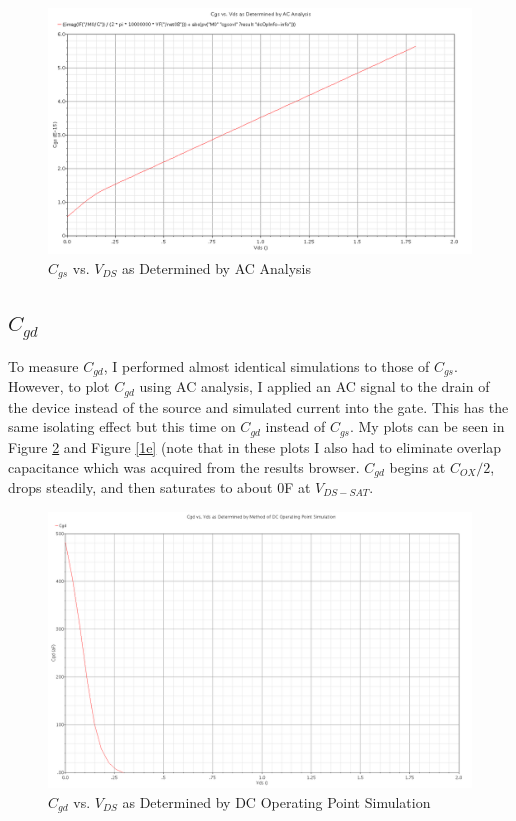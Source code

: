\documentclass{article}
\begin{document}
\begin{figure}[H]
\centering
\includegraphics[width=5in]{1d.png}
\caption{$C_{gs}$ vs. $V_{DS}$ as Determined by AC Analysis}
\label{1d}
\end{figure}
\newpage

\subsection{$C_{gd}$}
To measure $C_{gd}$, I performed almost identical simulations to those of $C_{gs}$. However, to plot $C_{gd}$ using AC analysis, I applied an AC signal to the drain of the device instead of the source and simulated current into the gate. This has the same isolating effect but this time on $C_{gd}$ instead of $C_{gs}$. My plots can be seen in Figure \ref{1b} and Figure \ref{1e} (note that in these plots I also had to eliminate overlap capacitance which was acquired from the results browser. $C_{gd}$ begins at $C_{OX}/2$, drops steadily, and then saturates to about 0F at $V_{DS-SAT}$.

\begin{figure}[H]
\centering
\includegraphics[width=5in]{1b.png}
\caption{$C_{gd}$ vs. $V_{DS}$ as Determined by DC Operating Point Simulation}
\label{1b}
\end{figure}
\end{document}
